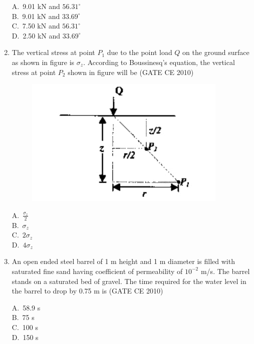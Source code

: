 \documentclass[journal,12pt,onecolumn]{exam}
\theoremstyle{remark}
\begin{document}
\begin{enumerate}
\begin{multicols}{2}
A.\ 9.01 kN and $56.31^\circ$ \\
B.\ 9.01 kN and $33.69^\circ$ \\
C.\ 7.50 kN and $56.31^\circ$ \\
D.\ 2.50 kN and $33.69^\circ$
\end{multicols}

\noindent\item The vertical stress at point $P_1$ due to the point load $Q$ on the ground surface as shown in figure is $\sigma_z$. According to Boussinesq's equation, the vertical stress at point $P_2$ shown in figure will be
\hfill{(GATE CE 2010)}

\begin{figure}[H]
     \centering
     \includegraphics[scale=0.55]{figs/e4388fce-713b-4dc9-a1a5-4b431f7ae7ed.jpg} 
     \caption{}
     \label{fig:figure8}
 \end{figure}

\begin{multicols}{4}
A.\ $\frac{\sigma_z}{2}$ \\
B.\ $\sigma_z$ \\
C.\ $2\sigma_z$ \\
D.\ $4\sigma_z$
\end{multicols}

\noindent\item An open ended steel barrel of 1 m height and 1 m diameter is filled with saturated fine sand having coefficient of permeability of $10^{-2}$ m/s. The barrel stands on a saturated bed of gravel. The time required for the water level in the barrel to drop by 0.75 m is \hfill{(GATE CE 2010)}
\begin{multicols}{4}
A.\ 58.9 s \\
B.\ 75 s \\
C.\ 100 s \\
D.\ 150 s
\end{multicols}


\end{enumerate}
\end{document}
